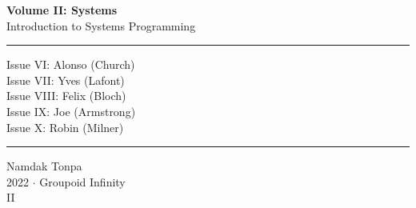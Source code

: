 \documentclass{article}
\begin{document}
\begin{titlepage}
    \centering
    \vspace*{0.5in}
    \Huge
    \textbf{Volume II: Systems} \\
    \LARGE
    Introduction to Systems Programming \\
    \vspace{1.5in}
    \rule{\textwidth}{0.4pt}
    \flushleft
    \small
    Issue VI: Alonso (Church) \\
    Issue VII: Yves (Lafont) \\
    Issue VIII: Felix (Bloch) \\
    Issue IX: Joe (Armstrong) \\
    Issue X: Robin (Milner) \\
    \rule{\textwidth}{0.4pt}
    \centering
    \vfill
    \large
    Namdak Tonpa \\
    \Large
    2022 $\cdot$ Groupoid Infinity \\
    II
\end{titlepage}

\tableofcontents
\newif\ifincludeTOC
\includeTOCfalse
\newpage \begin{standalone}  \end{standalone} %
\newpage \begin{standalone}    \end{standalone} %
\newpage \begin{standalone}   \end{standalone} %
\newpage \begin{standalone}     \end{standalone} %
\newpage \begin{standalone}   \end{standalone} %
\end{document}
